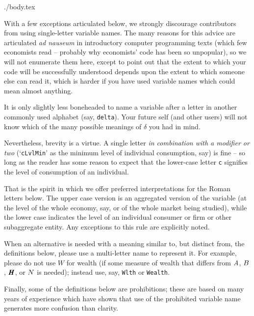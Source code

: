 \message{ !name(Variables-Single-Letter.tex)}\documentclass{econtex}
\begin{document}


\begin{verbatimwrite}{./body.tex}

With a few exceptions articulated below, we strongly discourage contributors from using single-letter variable names.  The many reasons for this advice are articulated {\it ad nauseum} in introductory computer programming texts (which few economists read -- probably why economists' code has been so unpopular), so we will not enumerate them here, except to point out that the extent to which your code will be successfully understood depends upon the extent to which someone else can read it, which is harder if you have used variable names which could mean almost anything.

It is only slightly less boneheaded to name a variable after a letter in another commonly used alphabet (say, \texttt{delta}).  Your future self (and other users) will not know which of the many possible meanings of $\delta$ you had in mind.

Nevertheless, brevity is a virtue.  A single letter {\it in combination with a modifier or two} (`\texttt{cLvlMin}' as the minimum level of individual consumption, say) is fine -- so long as the reader has some reason to expect that the lower-case letter \texttt{c} signifies the level of consumption of an individual.  

That is the spirit in which we offer preferred interpretations for the Roman letters below.  The upper case version is an aggregated version of the variable (at the level of the whole economy, say, or of the whole market being studied), while the lower case indicates the level of an individual consumer or firm or other subaggregate entity.  Any exceptions to this rule are explicitly noted.

When an alternative is needed with a meaning similar to, but distinct from, the definitions below, please use a multi-letter name to represent it.  For example, please do not use $W$ for wealth (if some measure of wealth that differs from $A$, $B$, $\pmb{H}$, or $N$ is needed); instead use, say, \texttt{Wlth} or \texttt{Wealth}. 

Finally, some of the definitions below are prohibitions; these are based on many years of experience which have shown that use of the prohibited variable name generates more confusion than clarity.  
\pagebreak


\end{verbatimwrite}
\end{document}

